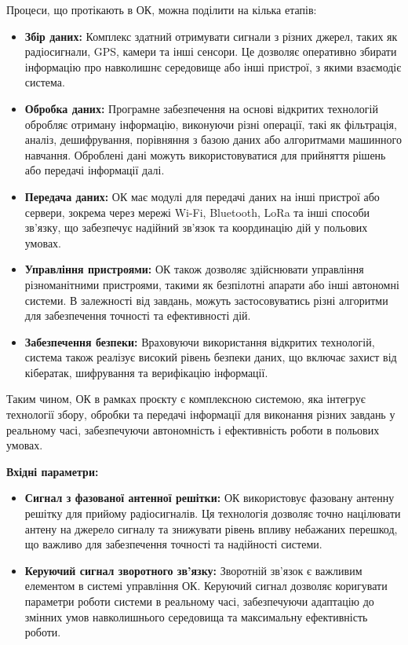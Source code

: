 \documentclass[a4paper]{article}
\begin{document}
Процеси, що протікають в ОК, можна поділити на кілька етапів:

\begin{itemize}
    \item \textbf{Збір даних:} Комплекс здатний отримувати сигнали з різних джерел, таких як радіосигнали, GPS, камери та інші сенсори. Це дозволяє оперативно збирати інформацію про навколишнє середовище або інші пристрої, з якими взаємодіє система.
    \item \textbf{Обробка даних:} Програмне забезпечення на основі відкритих технологій обробляє отриману інформацію, виконуючи різні операції, такі як фільтрація, аналіз, дешифрування, порівняння з базою даних або алгоритмами машинного навчання. Оброблені дані можуть використовуватися для прийняття рішень або передачі інформації далі.
    \item \textbf{Передача даних:} ОК має модулі для передачі даних на інші пристрої або сервери, зокрема через мережі Wi-Fi, Bluetooth, LoRa та інші способи зв'язку, що забезпечує надійний зв'язок та координацію дій у польових умовах.
    \item \textbf{Управління пристроями:} ОК також дозволяє здійснювати управління різноманітними пристроями, такими як безпілотні апарати або інші автономні системи. В залежності від завдань, можуть застосовуватись різні алгоритми для забезпечення точності та ефективності дій.
    \item \textbf{Забезпечення безпеки:} Враховуючи використання відкритих технологій, система також реалізує високий рівень безпеки даних, що включає захист від кібератак, шифрування та верифікацію інформації.
\end{itemize}

Таким чином, ОК в рамках проєкту є комплексною системою, яка інтегрує технології збору, обробки та передачі інформації для виконання різних завдань у реальному часі, забезпечуючи автономність і ефективність роботи в польових умовах.


\textbf{Вхідні параметри:}


\begin{itemize}
    \item \textbf{Сигнал з фазованої антенної решітки:} ОК використовує фазовану антенну решітку для прийому радіосигналів. Ця технологія дозволяє точно націлювати антену на джерело сигналу та знижувати рівень впливу небажаних перешкод, що важливо для забезпечення точності та надійності системи.
    \item \textbf{Керуючий сигнал зворотного зв'язку:} Зворотній зв'язок є важливим елементом в системі управління ОК. Керуючий сигнал дозволяє коригувати параметри роботи системи в реальному часі, забезпечуючи адаптацію до змінних умов навколишнього середовища та максимальну ефективність роботи.
\end{itemize}
\end{document}
